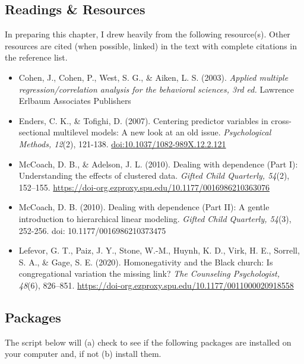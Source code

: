 \documentclass[
  11pt,
]{book}
\providecommand{\tightlist}{%
  \setlength{\itemsep}{0pt}\setlength{\parskip}{0pt}}
\begin{document}
\hypertarget{readings-resources}{%
\subsection{Readings \& Resources}\label{readings-resources}}

In preparing this chapter, I drew heavily from the following resource(s). Other resources are cited (when possible, linked) in the text with complete citations in the reference list.

\begin{itemize}
\tightlist
\item
  Cohen, J., Cohen, P., West, S. G., \& Aiken, L. S. (2003). \emph{Applied multiple regression/correlation analysis for the behavioral sciences, 3rd ed.} Lawrence Erlbaum Associates Publishers
\item
  Enders, C. K., \& Tofighi, D. (2007). Centering predictor variables in cross-sectional multilevel models: A new look at an old issue. \emph{Psychological Methods, 12}(2), 121-138. \url{doi:10.1037/1082-989X.12.2.121}
\item
  McCoach, D. B., \& Adelson, J. L. (2010). Dealing with dependence (Part I): Understanding the effects of clustered data. \emph{Gifted Child Quarterly, 54}(2), 152--155. \url{https://doi-org.ezproxy.spu.edu/10.1177/0016986210363076}
\item
  McCoach, D. B. (2010). Dealing with dependence (Part II): A gentle introduction to hierarchical linear modeling. \emph{Gifted Child Quarterly, 54}(3), 252-256. doi: 10.1177/0016986210373475
\item
  Lefevor, G. T., Paiz, J. Y., Stone, W.-M., Huynh, K. D., Virk, H. E., Sorrell, S. A., \& Gage, S. E. (2020). Homonegativity and the Black church: Is congregational variation the missing link? \emph{The Counseling Psychologist, 48}(6), 826--851. \url{https://doi-org.ezproxy.spu.edu/10.1177/0011000020918558}
\end{itemize}

\hypertarget{packages-1}{%
\subsection{Packages}\label{packages-1}}

The script below will (a) check to see if the following packages are installed on your computer and, if not (b) install them.
\end{document}
